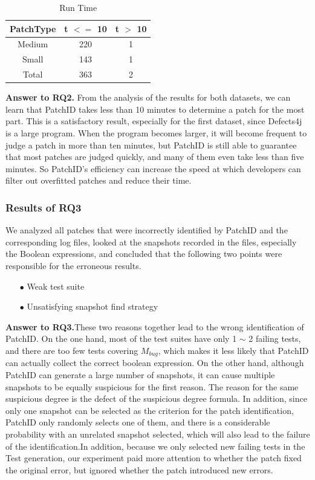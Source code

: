 \begin{table}[ht]
		\begin{minipage}{173px}
			\caption{Run Time}\label{tab8}%
			\begin{tabular}{ccc}
				\toprule
				PatchType & t $<=$ 10 & t $>$ 10
				\\
				\midrule
				Medium    &220 &1  \\
				Small    &143 &1     \\
				Total    &363 &2    \\
				\bottomrule
			\end{tabular}
		\end{minipage}
\end{table}

\textbf{Answer to RQ2.} From the analysis of the results for both datasets, we can learn that PatchID takes less than 10 minutes to determine a patch for the most part. This is a satisfactory result, especially for the first dataset, since Defects4j is a large program. When the program becomes larger, it will become frequent to judge a patch in more than ten minutes, but PatchID is still able to guarantee that most patches are judged quickly, and many of them even take less than five minutes. So PatchID's efficiency can increase the speed at which developers can filter out overfitted patches and reduce their time.

\subsubsection{Results of RQ3}\label{5.3.3}
We analyzed all patches that were incorrectly identified by PatchID and the corresponding log files, looked at the snapshots recorded in the files, especially the Boolean expressions, and concluded that the following two points were responsible for the erroneous results.
\begin{itemize}
	\item[$\bullet$] Weak test suite
	\item[$\bullet$] Unsatisfying snapshot find strategy
\end{itemize}

\textbf{Answer to RQ3.}These two reasons together lead to the wrong identification of PatchID. On the one hand, most of the test suites have only 1 $\sim$ 2 failing tests, and there are too few tests covering $M_{bug}$, which makes it less likely that PatchID can actually collect the correct boolean expression. On the other hand, although PatchID can generate a large number of snapshots, it can cause multiple snapshots to be equally suspicious for the first reason. The reason for the same suspicious degree is the defect of the suspicious degree formula. In addition, since only one snapshot can be selected as the criterion for the patch identification, PatchID only randomly selects one of them, and there is a considerable probability with an unrelated snapshot selected, which will also lead to the failure of the identification.In addition, because we only selected new failing tests in the Test generation, our experiment paid more attention to whether the patch fixed the original error, but ignored whether the patch introduced new errors.

